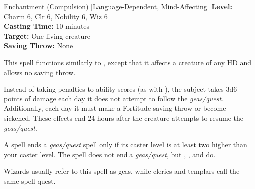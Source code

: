 {Enchantment (Compulsion) [Language-Dependent, Mind-Affecting]}
{
	\textbf{Level:}
	Charm 6, Clr 6, Nobility 6, Wiz 6\\
	\textbf{Casting Time:}
	10 minutes\\
	\textbf{Target:}
	One living creature\\
	\textbf{Saving Throw:}
	None\\
}
{
	This spell functions similarly to , except that it affects a creature of any HD and allows no saving throw.

	Instead of taking penalties to ability scores (as with ), the subject takes 3d6 points of damage each day it does not attempt to follow the \emph{geas/quest}. Additionally, each day it must make a Fortitude saving throw or become sickened. These effects end 24 hours after the creature attempts to resume the \emph{geas/quest}.

	A  spell ends a \emph{geas/quest} spell only if its caster level is at least two higher than your caster level. The  spell does not end a \emph{geas/quest}, but , , and  do.

	Wizards usually refer to this spell as geas, while clerics and templars call the same spell quest.
}
